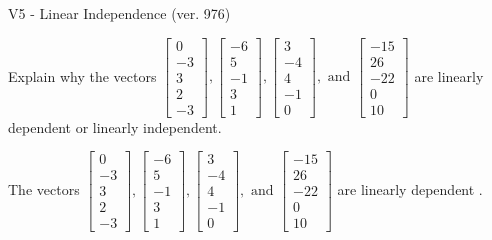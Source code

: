 \begin{exercise}
  \begin{exerciseTitle}V5 - Linear Independence (ver. 976)\end{exerciseTitle}
  \begin{exerciseStatement}
    Explain why the vectors \(\left[\begin{array}{r}
0 \\
-3 \\
3 \\
2 \\
-3
\end{array}\right] , \left[\begin{array}{r}
-6 \\
5 \\
-1 \\
3 \\
1
\end{array}\right] , \left[\begin{array}{r}
3 \\
-4 \\
4 \\
-1 \\
0
\end{array}\right] , \text{ and } \left[\begin{array}{r}
-15 \\
26 \\
-22 \\
0 \\
10
\end{array}\right]\) are linearly dependent or linearly independent.	


  \end{exerciseStatement}
  \begin{exerciseAnswer}
   The vectors \(\left[\begin{array}{r}
0 \\
-3 \\
3 \\
2 \\
-3
\end{array}\right] , \left[\begin{array}{r}
-6 \\
5 \\
-1 \\
3 \\
1
\end{array}\right] , \left[\begin{array}{r}
3 \\
-4 \\
4 \\
-1 \\
0
\end{array}\right] , \text{ and } \left[\begin{array}{r}
-15 \\
26 \\
-22 \\
0 \\
10
\end{array}\right]\) are 
  	 linearly dependent  .
  


  \end{exerciseAnswer}
\end{exercise}